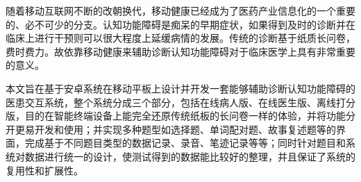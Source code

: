 
 

\makeatletter
\ifthu@bachelor\relax\else
  \ifthu@doctor
  \else
    \ifthu@master
    \fi
  \fi
\fi
\makeatother




\begin{cabstract}
随着移动互联网不断的改朝换代，移动健康已经成为了医药产业信息化的一个重要的、必不可少的分支。认知功能障碍是痴呆的早期症状，如果得到及时的诊断并在临床上进行干预则可以很大程度上延缓病情的发展。传统的诊断基于纸质长问卷，费时费力。故依靠移动健康来辅助诊断认知功能障碍对于临床医学上具有非常重要的意义。

本文旨在基于安卓系统在移动平板上设计并开发一套能够辅助诊断认知功能障碍的医患交互系统，整个系统分成三个部分，包括在线病人版、在线医生版、离线打分版，目的在智能终端设备上能完全还原传统纸板的长问卷一样的体验，并将功能分开更易开发和使用；并实现多种题型如选择题、单词配对题、故事复述题等的界面，完成基于不同题目类型的数据记录、录音、笔迹记录等等；同时针对题目和系统对数据进行统一的设计，使测试得到的数据能比较好的整理，并且保证了系统的复用性和扩展性。
\end{cabstract}

